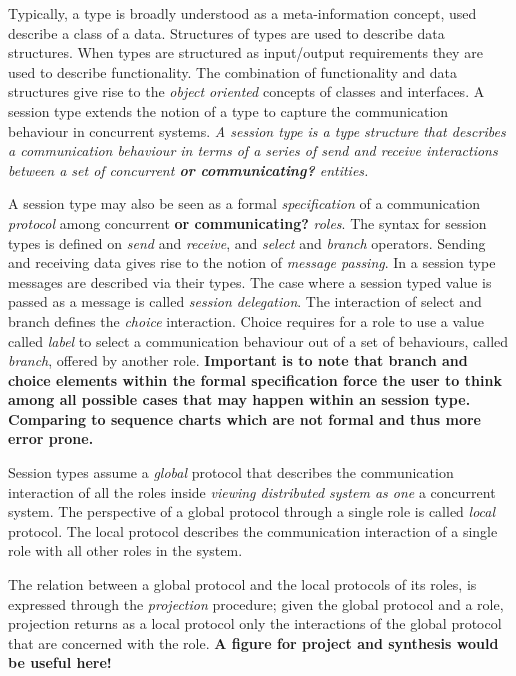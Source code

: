 Typically, a type is broadly understood
as a meta-information concept, used describe a class of a data.
Structures of types are used to describe data structures.
When types are structured as input/output requirements they
are used to describe functionality.
The combination of functionality and data structures give rise
to the \emph{object oriented} concepts of classes and interfaces.%
%
A session type extends %
the notion of a type to capture the communication behaviour in concurrent systems.
{\em A session type is a type structure that describes a communication
	behaviour in terms of a series of send and receive %
	interactions between a set of concurrent \textbf{or communicating?} entities.}

A session type may also be seen as a
formal {\em specification} of a communication {\em protocol} among concurrent \textbf{or communicating?} {\em roles}.
The syntax for session types is defined on {\em send} and {\em receive},
and {\em select} and {\em branch} operators.
Sending and receiving data gives rise to the notion of {\em message passing}.
In a session type messages are described via their types.
The case where a session typed value is passed as a message is called {\em session delegation}.
The interaction of select and branch defines the {\em choice} interaction.
Choice requires for a role to use a value called {\em label}
to select a communication behaviour out of a set of behaviours, called {\em branch},
offered by another role. \textbf{Important is to note that branch and choice elements within the formal specification force the user to think among all possible cases that may happen within an session type. Comparing to sequence charts which are not formal and thus more error prone.}

Session types assume a {\em global} protocol that describes the
communication interaction of all the roles inside \emph{viewing distributed system as one} a concurrent system.
The perspective of a global protocol through a single role
is called {\em local} protocol. The local protocol describes
the communication interaction of a single role with all other roles
in the system.

The relation between a global protocol and the
local protocols of its roles, is expressed
through the {\em projection} procedure;
given the global protocol and a role, projection
returns as a local protocol only the
interactions of the global protocol that are concerned with
the role. \textbf{A figure for project and synthesis would be useful here!}


